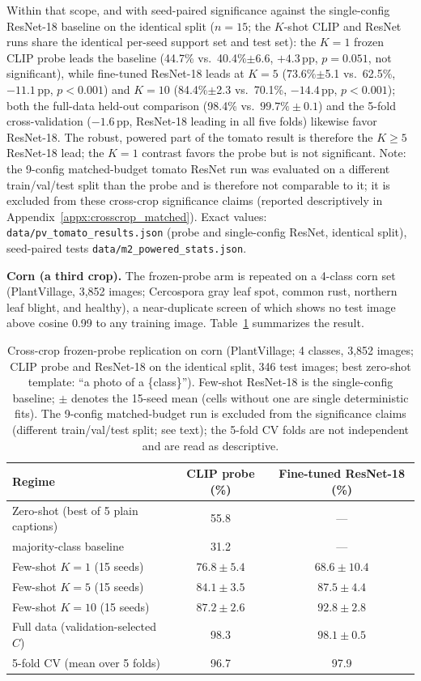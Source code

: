 \documentclass[10pt,a4paper]{article}
\begin{document}
Within that scope, and with seed-paired significance against the single-config ResNet-18 baseline on the identical split ($n{=}15$; the $K$-shot CLIP and ResNet runs share the identical per-seed support set and test set): the $K{=}1$ frozen CLIP probe leads the baseline (44.7\% vs.\ 40.4\%$\pm$6.6, $+4.3$\,pp, $p{=}0.051$, not significant), while fine-tuned ResNet-18 leads at $K{=}5$ (73.6\%$\pm$5.1 vs.\ 62.5\%, $-11.1$\,pp, $p{<}0.001$) and $K{=}10$ (84.4\%$\pm$2.3 vs.\ 70.1\%, $-14.4$\,pp, $p{<}0.001$); both the full-data held-out comparison (98.4\% vs.\ $99.7\%\pm0.1$) and the 5-fold cross-validation ($-1.6$\,pp, ResNet-18 leading in all five folds) likewise favor ResNet-18. The robust, powered part of the tomato result is therefore the $K{\geq}5$ ResNet-18 lead; the $K{=}1$ contrast favors the probe but is not significant. Note: the 9-config matched-budget tomato ResNet run was evaluated on a different train/val/test split than the probe and is therefore not comparable to it; it is excluded from these cross-crop significance claims (reported descriptively in Appendix~\ref{appx:crosscrop_matched}). Exact values: \texttt{data/pv\_tomato\_results.json} (probe and single-config ResNet, identical split), seed-paired tests \texttt{data/m2\_powered\_stats.json}.

\textbf{Corn (a third crop).} The frozen-probe arm is repeated on a 4-class corn set (PlantVillage, 3{,}852 images; Cercospora gray leaf spot, common rust, northern leaf blight, and healthy), a near-duplicate screen of which shows no test image above cosine 0.99 to any training image. Table~\ref{tab:corn} summarizes the result.

\begin{table}[!ht]
\centering
\caption{Cross-crop frozen-probe replication on corn (PlantVillage; 4 classes, 3{,}852 images; CLIP probe and ResNet-18 on the identical split, 346 test images; best zero-shot template: ``a photo of a \{class\}''). Few-shot ResNet-18 is the single-config baseline; $\pm$ denotes the 15-seed mean (cells without one are single deterministic fits). The 9-config matched-budget run is excluded from the significance claims (different train/val/test split; see text); the 5-fold CV folds are not independent and are read as descriptive.}
\label{tab:corn}
\begin{tabular}{lcc}
\toprule
\textbf{Regime} & \textbf{CLIP probe (\%)} & \textbf{Fine-tuned ResNet-18 (\%)} \\
\midrule
Zero-shot (best of 5 plain captions) & 55.8 & --- \\
\quad majority-class baseline       & 31.2 & --- \\
Few-shot $K{=}1$  (15 seeds) & $76.8\pm5.4$ & $68.6\pm10.4$ \\
Few-shot $K{=}5$  (15 seeds) & $84.1\pm3.5$ & $87.5\pm4.4$ \\
Few-shot $K{=}10$ (15 seeds) & $87.2\pm2.6$ & $92.8\pm2.8$ \\
Full data (validation-selected $C$) & 98.3 & $98.1\pm0.5$ \\
5-fold CV (mean over 5 folds) & 96.7 & 97.9 \\
\bottomrule
\end{tabular}
\end{table}
\end{document}
